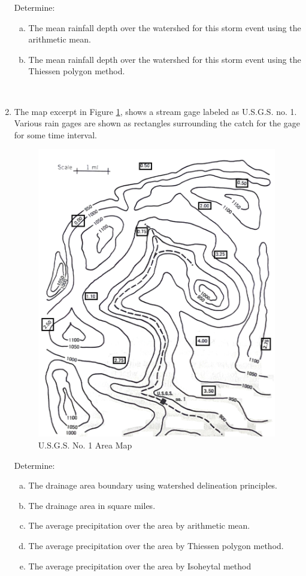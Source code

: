 \documentclass[12pt]{article}
\begin{document}
\begin{enumerate}
\begin{table}[h!]
\begin{tabular}{p{2.0in}p{2.0in}}
\hline
\end{tabular}
\label{tab:gagemap}
\end{table}

Determine:
    \begin{enumerate}[a)]
        \item The mean rainfall depth over the watershed for this storm event using the arithmetic mean. 
        \item The mean rainfall depth over the watershed for this storm event using the Thiessen polygon method. 
    \end{enumerate}

\clearpage
~\newline
\clearpage
\item The map excerpt in Figure \ref{fig:usgsmap}, shows a stream gage labeled as U.S.G.S. no. 1.  Various rain gages are shown as rectangles surrounding the catch for the gage for some time interval.  

\begin{figure}[h!] %
   \centering
   \includegraphics[height=5in]{Map.jpg} 
   \caption{U.S.G.S. No. 1 Area Map}
   \label{fig:usgsmap}
\end{figure}

Determine:
    \begin{enumerate}[a)]
        \item The drainage area boundary using watershed delineation principles.
        \item The drainage area in square miles. 
        \item The average precipitation over the area by arithmetic mean. 
        \item The average precipitation over the area by Thiessen polygon method. 
        \item The average precipitation over the area by Isoheytal method
    \end{enumerate}



\end{enumerate}
\end{document}
